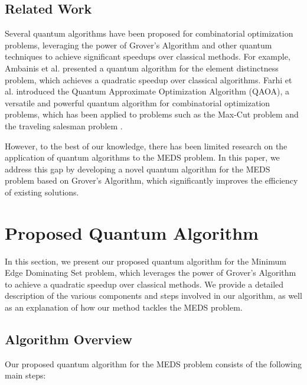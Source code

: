 \subsection{Related Work}\label{subsec:related_work}

Several quantum algorithms have been proposed for combinatorial optimization problems, leveraging the power of Grover's Algorithm and other quantum techniques to achieve significant speedups over classical methods. For example, Ambainis et al. \cite{ambainis2014quantum} presented a quantum algorithm for the element distinctness problem, which achieves a quadratic speedup over classical algorithms. Farhi et al. \cite{farhi2014quantum} introduced the Quantum Approximate Optimization Algorithm (QAOA), a versatile and powerful quantum algorithm for combinatorial optimization problems, which has been applied to problems such as the Max-Cut problem \cite{farhi2014quantum} and the traveling salesman problem \cite{hadfield2017quantum}.

However, to the best of our knowledge, there has been limited research on the application of quantum algorithms to the MEDS problem. In this paper, we address this gap by developing a novel quantum algorithm for the MEDS problem based on Grover's Algorithm, which significantly improves the efficiency of existing solutions.

\section{Proposed Quantum Algorithm}\label{sec:algorithm}

In this section, we present our proposed quantum algorithm for the Minimum Edge Dominating Set problem, which leverages the power of Grover's Algorithm to achieve a quadratic speedup over classical methods. We provide a detailed description of the various components and steps involved in our algorithm, as well as an explanation of how our method tackles the MEDS problem.

\subsection{Algorithm Overview}\label{subsec:algorithm_overview}

Our proposed quantum algorithm for the MEDS problem consists of the following main steps:

